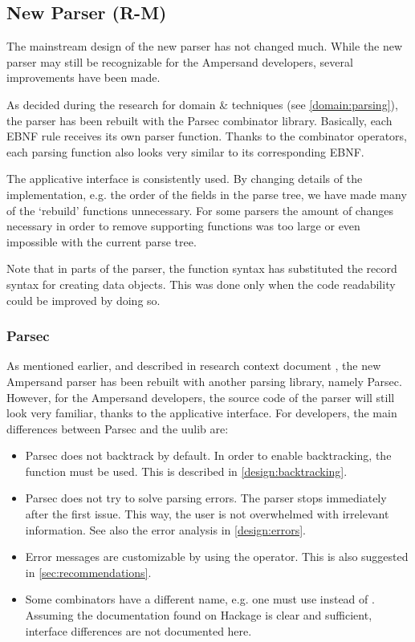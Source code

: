 
\subsection{New Parser (R-M)}
\label{design:new-parser}
The mainstream design of the new parser has not changed much.
While the new parser may still be recognizable for the Ampersand developers, several improvements have been made.

As decided during the research for domain \& techniques (see \autoref{domain:parsing}), the parser has been rebuilt with the Parsec combinator library.
Basically, each EBNF rule receives its own parser function.
Thanks to the combinator operators, each parsing function also looks very similar to its corresponding EBNF.

The applicative interface is consistently used.
By changing details of the implementation, e.g. the order of the fields in the parse tree, we have made many of the `rebuild' functions unnecessary.
For some parsers the amount of changes necessary in order to remove supporting functions was too large or even impossible with the current parse tree.

Note that in parts of the parser, the function syntax has substituted the record syntax for creating data objects.
This was done only when the code readability could be improved by doing so.

\subsubsection{Parsec}
\label{design:parsing-lib}
As mentioned earlier, and described in research context document , the new Ampersand parser has been rebuilt with another parsing library, namely Parsec.
However, for the Ampersand developers, the source code of the parser will still look very familiar, thanks to the applicative interface.
For developers, the main differences between Parsec and the uulib are:
\begin{itemize}
  \item Parsec does not backtrack by default.
    In order to enable backtracking, the  function must be used.
    This is described in \autoref{design:backtracking}.
  \item Parsec does not try to solve parsing errors.
    The parser stops immediately after the first issue.
   This way, the user is not overwhelmed with irrelevant information.
    See also the error analysis in \autoref{design:errors}.
  \item Error messages are customizable by using the  operator.
    This is also suggested in \autoref{sec:recommendations}.
  \item Some combinators have a different name, e.g. one must use  instead of .
    Assuming the documentation found on Hackage is clear and sufficient, interface differences are not documented here.
\end{itemize}

